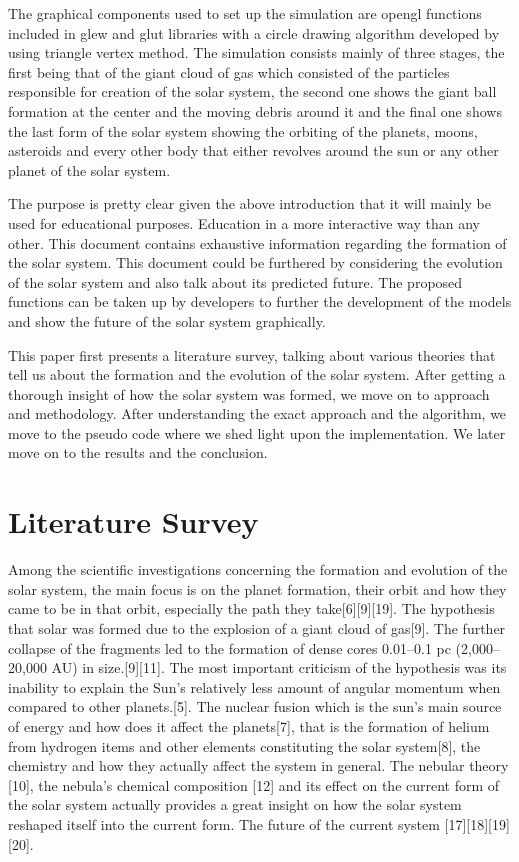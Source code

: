\documentclass[letterpaper, 10 pt, conference]{ieeeconf}  %
\begin{document}
The graphical components used to set up the simulation are opengl functions included in glew and glut libraries with a circle drawing algorithm developed by using triangle vertex method. The simulation consists mainly of three stages, the first being that of the giant cloud of gas which consisted of the particles responsible for creation of the solar system, the second one shows the giant ball formation at the center and the moving debris around it and the final one shows the last form of the solar system showing the orbiting of the planets, moons, asteroids and every other body that either revolves around the sun or any other planet of the solar system.

The purpose is pretty clear given the above introduction that it will mainly be used for educational purposes. Education in a more interactive way than any other. This document contains exhaustive information regarding the formation of the solar system. This document could be furthered by considering the evolution of the solar system and also talk about its predicted future. The proposed functions can be taken up by developers to further the development of the models and show the future of the solar system graphically.

This paper first presents a literature survey, talking about various theories that tell us about the formation and the evolution of the solar system. After getting a thorough insight of how the solar system was formed, we move on to approach and methodology. After understanding the exact approach and the algorithm, we move to the pseudo code where we shed light upon the implementation. We later move on to the results and the conclusion.



\section{Literature Survey}
Among the scientific investigations concerning the formation and evolution of the solar system, the main focus is on the planet formation, their orbit and how they came to be in that orbit, especially the path they take[6][9][19]. The hypothesis that solar was formed due to the explosion of a giant cloud of gas[9].  The further collapse of the fragments led to the formation of dense cores 0.01–0.1 pc (2,000–20,000 AU) in size.[9][11]. The most important criticism of the hypothesis was its inability to explain the Sun's relatively less amount of angular momentum when compared to other planets.[5]. The nuclear fusion which is the sun’s main source of energy and how does it affect the planets[7], that is the formation of helium from hydrogen items and other elements constituting the solar system[8], the chemistry and how they actually affect the system in general. The nebular theory [10], the nebula’s chemical composition [12] and its effect on the current form of the solar system actually provides a great insight on how the solar system reshaped itself into the current form. The future of the current system [17][18][19][20].
\end{document}
